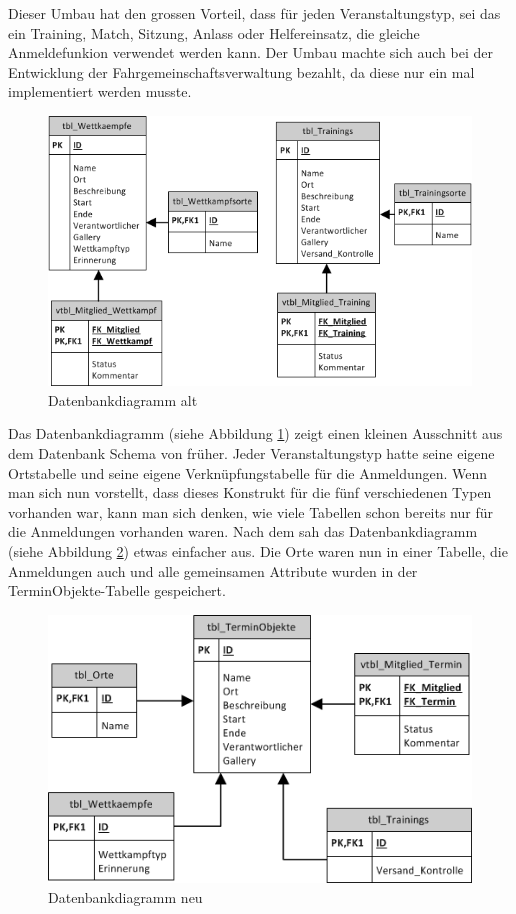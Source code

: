 Dieser Umbau hat den grossen Vorteil, dass für jeden Veranstaltungstyp, sei das ein Training, Match, Sitzung, Anlass oder Helfereinsatz, die gleiche Anmeldefunkion verwendet werden kann. Der Umbau machte sich auch bei der Entwicklung der Fahrgemeinschaftsverwaltung bezahlt, da diese nur ein mal implementiert werden musste.\\

\begin{figure}[h]
\centering
\includegraphics[scale=0.7]{images/visio/datenbankdiagramm_alt.png}
\caption{Datenbankdiagramm alt}
\label{fig:db_schema_alt}
\end{figure}

Das Datenbankdiagramm (siehe Abbildung \ref{fig:db_schema_alt}) zeigt einen kleinen Ausschnitt aus dem Datenbank Schema von früher. Jeder Veranstaltungstyp hatte seine eigene Ortstabelle und seine eigene Verknüpfungstabelle für die Anmeldungen. Wenn man sich nun vorstellt, dass dieses Konstrukt für die fünf verschiedenen Typen vorhanden war, kann man sich denken, wie viele Tabellen schon bereits nur für die Anmeldungen vorhanden waren. Nach dem  sah das Datenbankdiagramm (siehe Abbildung \ref{fig:db_schema_neu}) etwas einfacher aus. Die Orte waren nun in einer Tabelle, die Anmeldungen auch und alle gemeinsamen Attribute wurden in der TerminObjekte-Tabelle gespeichert.

\begin{figure}[h]
\centering
\includegraphics[scale=0.7]{images/visio/datenbankdiagramm_neu.png}
\caption{Datenbankdiagramm neu}
\label{fig:db_schema_neu}
\end{figure}

